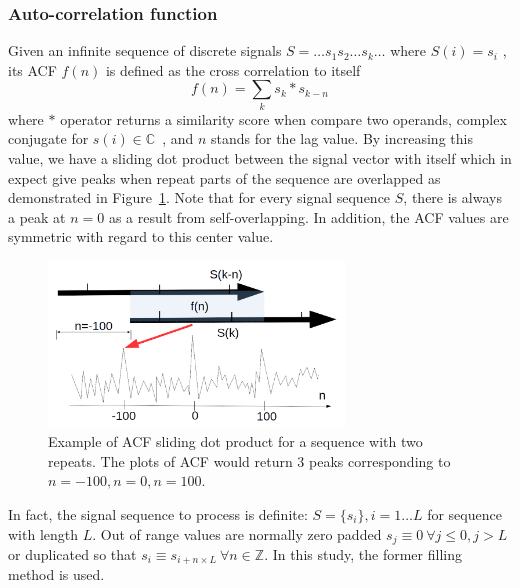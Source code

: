 \subsubsection{Auto-correlation function}
Given an infinite sequence of discrete signals $S=\ldots s_1 s_2 \ldots s_k \ldots$ where $S(i)=s_i$ , its ACF $f(n)$ is defined as the cross correlation to itself
\begin{equation}
 f(n)=\sum_{k}{s_k\ast s_{k-n}}   
 \label{eq:acf}
\end{equation}
where $\ast$ operator returns a similarity score when compare two operands, \EG{} complex conjugate for $s(i) \in \mathbb{C}$~\cite{Rockwood2005crosscorrelation}, and $n$ stands for the lag value. By increasing this value, we have a sliding dot product between the signal vector with itself which in expect give peaks when repeat parts of the sequence are overlapped as demonstrated in Figure~\ref{fig:concat_acf}. Note that for every signal sequence $S$, there is always a peak at $n=0$ as a result from self-overlapping. In addition, the ACF values are symmetric with regard to this center value.
\begin{figure}[ht]
\centerline{\includegraphics[width=0.7\textwidth]{images/acf.png}}
\caption[Example of ACF sliding dot product for a sequence with two repeats]{Example of ACF sliding dot product for a sequence with two repeats. The plots of ACF would return 3 peaks corresponding to $n=-100, n=0, n=100$.}
\label{fig:concat_acf}
\end{figure}

In fact, the signal sequence to process is definite: $S=\{s_i\}, i=1 \ldots L$ for sequence with length $L$. Out of range values are normally zero padded $s_j \equiv 0 \: \forall j \leq 0,j > L$ or duplicated so that $s_i \equiv s_{i+n \times L} \: \forall n \in \mathbb{Z}$. In this study, the former filling method is used.
